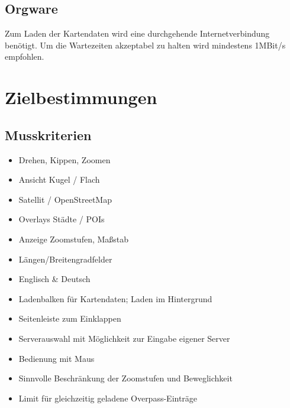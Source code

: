 \documentclass[10pt]{scrreprt}
\begin{document}
\section{Orgware}
Zum Laden der Kartendaten wird eine durchgehende Internetverbindung benötigt. Um die Wartezeiten akzeptabel zu halten wird mindestens 1MBit/s empfohlen.




\chapter{Zielbestimmungen}

\section{Musskriterien}
\begin{itemize}
\item Drehen, Kippen, Zoomen
\item Ansicht Kugel / Flach
\item Satellit / OpenStreetMap
\item Overlays Städte / POIs
\item Anzeige Zoomstufen, Maßstab
\item Längen/Breitengradfelder
\item Englisch \& Deutsch
\item Ladenbalken für Kartendaten; Laden im Hintergrund
\item Seitenleiste zum Einklappen
\item Serverauswahl mit Möglichkeit zur Eingabe eigener Server
\item Bedienung mit Maus 
\item Sinnvolle Beschränkung der Zoomstufen und Beweglichkeit 
\item Limit für gleichzeitig geladene Overpass-Einträge
\end{itemize}
\end{document}
